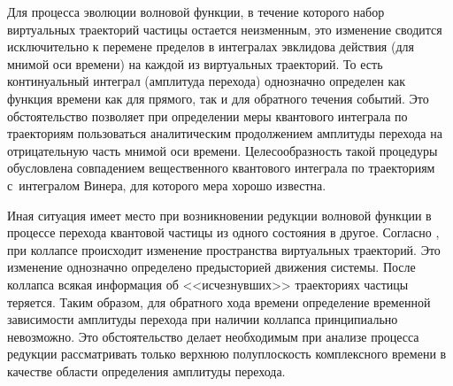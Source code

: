Для процесса эволюции волновой функции, в течение которого набор виртуальных траекторий частицы остается неизменным, это изменение сводится исключительно к перемене пределов в интегралах эвклидова действия (для мнимой оси времени) на каждой из виртуальных траекторий. То есть континуальный интеграл (амплитуда перехода) однозначно определен как функция времени как для прямого, так и для обратного течения событий. Это обстоятельство позволяет при определении меры квантового интеграла по траекториям пользоваться аналитическим продолжением амплитуды перехода на отрицательную часть мнимой оси времени. Целесообразность такой процедуры обусловлена совпадением вещественного квантового интеграла по траекториям с~интегралом Винера, для которого мера хорошо известна.

Иная ситуация имеет место при возникновении редукции волновой функции в процессе перехода квантовой частицы из одного состояния в другое. Согласно \cite{bib:PRL}, при коллапсе происходит изменение пространства виртуальных траекторий. Это изменение однозначно определено предысторией движения системы. После коллапса всякая информация об <<исчезнувших>> траекториях частицы теряется.
Таким образом, для обратного хода времени определение временной зависимости амплитуды перехода при наличии коллапса принципиально невозможно. Это обстоятельство делает необходимым при анализе процесса редукции рассматривать только верхнюю полуплоскость комплексного времени в качестве области определения амплитуды перехода.

\smallskip

